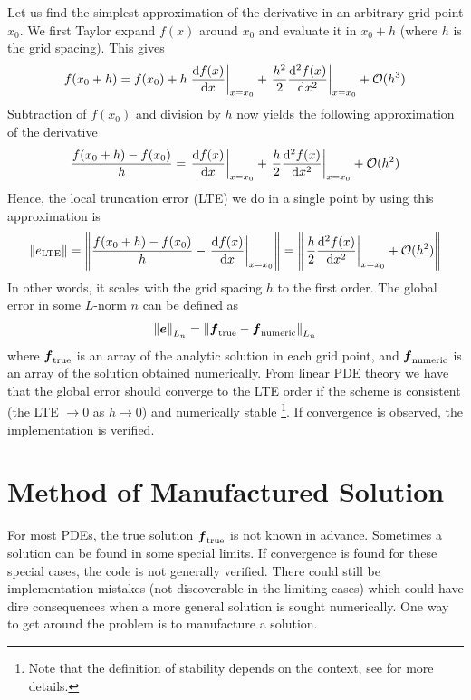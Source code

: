 Let us find the simplest approximation of the derivative in an arbitrary grid point $x_0$.
We first Taylor expand $f(x)$ around $x_0$ and evaluate it in $x_0 + h$ (where $h$ is the grid spacing).
This gives
%
\begin{align*}
    f(x_0+h)
    = f(x_0)
    + h \left.\frac{\text{d}{f(x)}}{\text{d}{x}}\right|_{x=x_0}
    + \left.\frac{h^2}{2}\frac{\text{d}{^2f(x)}}{\text{d}{x^2}}\right|_{x=x_0}
    + \mathcal{O}(h^3)
\end{align*}
%
Subtraction of $f(x_0)$ and division by $h$ now yields the following approximation of the derivative
%
\begin{align*}
    \frac{f(x_0+h) - f(x_0)}{h}
    =  \left.\frac{\text{d}{f(x)}}{\text{d}{x}}\right|_{x=x_0}
    + \left.\frac{h}{2}\frac{\text{d}{^2f(x)}}{\text{d}{x^2}}\right|_{x=x_0}
    + \mathcal{O}(h^2)
\end{align*}
%
Hence, the local truncation error (LTE) we do in a single point by using this approximation is
%
\begin{align*}
    \|e_{\text{LTE}}\|
    =
    \left\|\frac{f(x_0+h) - f(x_0)}{h} - \left.\frac{\text{d}{f(x)}}{\text{d}{x}}\right|_{x=x_0}\right\|
    =
    \left\| \left.\frac{h}{2}\frac{\text{d}{^2f(x)}}{\text{d}{x^2}}\right|_{x=x_0} + \mathcal{O}(h^2)\right\|
\end{align*}
%
In other words, it scales with the grid spacing $h$ to the first order.
The global error in some $L$-norm $n$ can be defined as
%
\begin{align*}
    \left\|\boldsymbol{e}\right\|_{L_n} =
    \left\|\boldsymbol{f}_{\text{true}} - \boldsymbol{f}_{\text{numeric}}\right\|_{L_n}
\end{align*}
%
where $\boldsymbol{f}_{\text{true}}$ is an array of the analytic solution in each grid point, and $\boldsymbol{f}_{\text{numeric}}$ is an array of the solution obtained numerically.
From linear PDE theory we have that the global error should converge to the LTE order if the scheme is consistent (the LTE $\to 0$ as $h\to 0$) and numerically stable%
\footnote{Note that the definition of stability depends on the context, see \cite{Leveque2007book} for more details.}.
%
If convergence is observed, the implementation is verified.

\section{Method of Manufactured Solution}
\label{sec:MMS}
For most PDEs, the true solution $\boldsymbol{f}_{\text{true}}$ is not known in advance.
Sometimes a solution can be found in some special limits.
If convergence is found for these special cases, the code is not generally verified.
There could still be implementation mistakes (not discoverable in the limiting cases) which could have dire consequences when a more general solution is sought numerically.
One way to get around the problem is to manufacture a solution.

